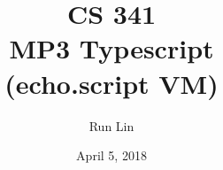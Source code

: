 \documentclass[12pt, letterpaper]{article}
\title{CS 341\\ MP3 Typescript\\ (echo.script VM)}
\author{Run Lin}
\date{April 5, 2018}
\begin{document}
\begin{titlepage}
\maketitle
\thispagestyle{empty}
\end{titlepage}
\end{document}
